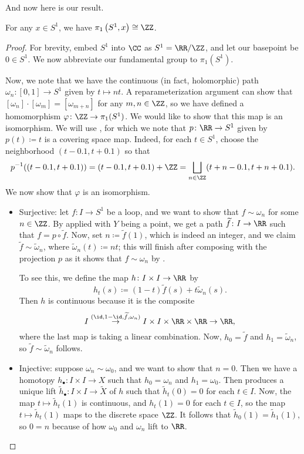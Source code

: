 \documentclass[../notes.tex]{subfiles}
\begin{document}
And now here is our result.
\begin{theorem} \label{thm:pi1-s1}
	For any $x\in S^1$, we have $\pi_1\left(S^1,x\right)\cong\ZZ$.
\end{theorem}
\begin{proof}
	For brevity, embed $S^1$ into $\CC$ as $S^1=\RR/\ZZ$, and let our basepoint be $0\in S^1$. We now abbreviate our fundamental group to $\pi_1\left(S^1\right)$.
	
	Now, we note that we have the continuous (in fact, holomorphic) path $\omega_n\colon[0,1]\to S^1$ given by $t\mapsto nt$. A reparameterization argument can show that $[\omega_n]\cdot[\omega_m]=[\omega_{m+n}]$ for any $m,n\in\ZZ$, so we have defined a homomorphism $\varphi\colon\ZZ\to\pi_1(S^1)$. We would like to show that this map is an isomorphism. We will use , for which we note that $p\colon\RR\to S^1$ given by $p(t)\coloneqq t$ is a covering space map. Indeed, for each $t\in S^1$, choose the neighborhood $(t-0.1,t+0.1)$ so that
	\[p^{-1}((t-0.1,t+0.1))=(t-0.1,t+0.1)+\ZZ=\bigsqcup_{n\in\ZZ}(t+n-0.1,t+n+0.1).\]
	We now show that $\varphi$ is an isomorphism.
	\begin{itemize}
		\item Surjective: let $f\colon I\to S^1$ be a loop, and we want to show that $f\sim\omega_n$ for some $n\in\ZZ$. By  applied with $Y$ being a point, we get a path $\widetilde f\colon I\to\RR$ such that $f=p\circ\widetilde f$. Now, set $n\coloneqq\widetilde f(1)$, which is indeed an integer, and we claim $\widetilde f\sim\widetilde\omega_n$, where $\widetilde\omega_n(t)\coloneqq nt$; this will finish after composing with the projection $p$ as it shows that $f\sim\omega_n$ by .

		To see this, we define the map $h\colon I\times I\to\RR$ by
		\[h_t(s)\coloneqq(1-t)\widetilde f(s)+t\widetilde\omega_n(s).\]
		Then $h$ is continuous because it is the composite
		\[I\stackrel{(\id,1-\id,\widetilde f,\omega_n)}\to I\times I\times\RR\times\RR\to\RR,\]
		where the last map is taking a linear combination. Now, $h_0=\widetilde f$ and $h_1=\widetilde\omega_n$, so $\widetilde f\sim\widetilde\omega_n$ follows.
		
		\item Injective: suppose $\omega_n\sim\omega_0$, and we want to show that $n=0$. Then we have a homotopy $h_\bullet\colon I\times I\to X$ such that $h_0=\omega_n$ and $h_1=\omega_0$. Then  produces a unique lift $\widetilde h_\bullet\colon I\times I\to\widetilde X$ of $h$ such that $\widetilde h_t(0)=0$ for each $t\in I$. Now, the map $t\mapsto\widetilde h_t(1)$ is continuous, and $h_t(1)=0$ for each $t\in I$, so the map $t\mapsto\widetilde h_t(1)$ maps to the discrete space $\ZZ$. It follows that $\widetilde h_0(1)=\widetilde h_1(1)$, so $0=n$ because of how $\omega_0$ and $\omega_n$ lift to $\RR$.
		\qedhere
	\end{itemize}
\end{proof}
\end{document}
